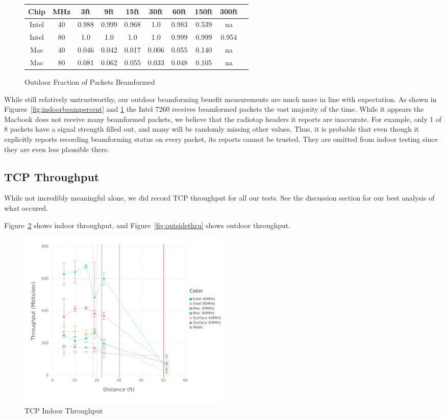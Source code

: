 \begin{figure}[b!]
\centering
\begin{tabular}{| c | c || c | c | c | c | c | c | c | c |}
\hline
Chip & MHz & 3ft & 9ft & 15ft & 30ft & 60ft & 150ft & 300ft\\ \hline
Intel & 40 & 0.988 & 0.999 & 0.968 & 1.0 & 0.983 & 0.539 & na\\ \hline
Intel & 80 & 1.0 & 1.0 & 1.0 & 1.0 & 0.999 & 0.999 & 0.954\\ \hline
Mac & 40 & 0.046 & 0.042 & 0.017 & 0.006 & 0.055 & 0.140 & na\\ \hline
Mac & 80 & 0.081 & 0.062 & 0.055 & 0.033 & 0.048 & 0.105 & na\\ \hline
\end{tabular}
\caption{Outdoor Fraction of Packets Beamformed}
\label{fig:outdoorbeampercent}
\end{figure}


While still relatively untrustworthy, our outdoor beamforming benefit
measurements are much more in line with expectation. As shown in
Figures~\ref{fig:indoorbeampercent} and \ref{fig:outdoorbeampercent}
the Intel 7260 receives beamformed packets the vast majority of the
time. While it appears the Macbook does not receive many beamformed
packets, we believe that the radiotap headers it reports are
inaccurate. For example, only 1 of 8 packets have a signal strength
filled out, and many will be randomly missing other values. Thus, it
is probable that even though it explicitly reports recording
beamforming status on every packet, its reports cannot be
trusted. They are omitted from indoor testing since they are even less
plausible there.


\subsection{TCP Throughput}
While not incredibly meaningful alone, we did record TCP throughput
for all our tests. See the discussion section for our best analysis of
what occured.

Figure~\ref{fig:insidethru} shows indoor throughput, and
Figure~\ref{fig:outsidethru} shows outdoor throughput.

\begin{figure}[!h]
\centering
\includegraphics[width=0.5\textwidth]{figures/allchip_Inside_TCP_Throughput}
\caption{TCP Indoor Throughput}
\label{fig:insidethru}
\end{figure}

